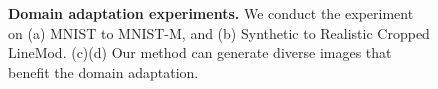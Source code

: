 \documentclass[runningheads]{llncs}
\begin{document}
\begin{figure}[t]
    \hfill
    \vspace{-1mm}
	\caption{\textbf{Domain adaptation experiments.} We conduct the experiment on (a) MNIST to MNIST-M, and (b) Synthetic to Realistic Cropped LineMod. (c)(d) Our method can generate diverse images that benefit the domain adaptation.
   } 
	\label{figure:da}
    \vspace{\figmargin}
    \vspace{+2mm}
\end{figure}
\end{document}
